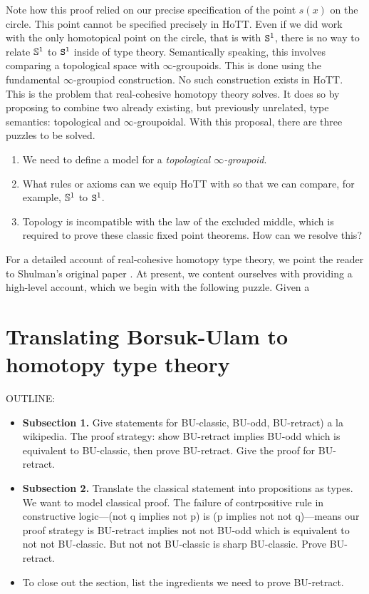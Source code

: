 \documentclass{amsart}
\begin{document}
Note how this proof relied on our precise specification of
the point $ s(x) $ on the circle.  This point cannot be
specified precisely in HoTT. Even if we did work with the
only homotopical point on the circle, that is with $ \S^1 $,
there is no way to relate $ \SS^1 $ to $ \S^1 $ inside of
type theory. Semantically speaking, this involves comparing
a topological space with $ \infty $-groupoids. This is done
using the fundamental $ \infty $-groupiod construction.  No
such construction exists in HoTT. This is the problem that
real-cohesive homotopy theory solves. It does so by
proposing to combine two already existing, but previously
unrelated, type semantics: topological and
$ \infty $-groupoidal. With this proposal, there are three
puzzles to be solved.

\begin{enumerate}
\item We need to define a model for a \emph{topological $ \infty
    $-groupoid}.
\item What rules or axioms can we equip HoTT with so that we
  can compare, for example, $ \SS^1 $ to $ \S^1 $.
\item Topology is incompatible with the law of the excluded
  middle, which is required to prove these classic fixed
  point theorems. How can we resolve this?
\end{enumerate}






For a detailed account of real-cohesive homotopy type
theory, we point the reader to Shulman's original paper
\cite{shul:bfp}. At present, we content ourselves with
providing a high-level account, which we begin with the
following puzzle.  Given a 






\section{Translating Borsuk-Ulam to homotopy type theory}
\label{sec:bu-to-hott}

OUTLINE:
\begin{itemize}
\item
  \textbf{Subsection 1.} Give statements for BU-classic,
  BU-odd, BU-retract) a la wikipedia. The proof strategy:
  show BU-retract implies BU-odd which is equivalent to
  BU-classic, then prove BU-retract. Give the proof for
  BU-retract.
\item
  \textbf{Subsection 2.} Translate the classical statement
  into propositions as types. We want to model classical proof.
  The failure of contrpositive rule in constructive
  logic---(not q implies not p) is (p implies not not
  q)---means our proof strategy is BU-retract implies not
  not BU-odd which is equivalent to not not BU-classic. But
  not not BU-classic is sharp BU-classic. Prove BU-retract. 
\item
  To close out the section, list the ingredients we need to
  prove BU-retract.
\end{itemize}
\end{document}
